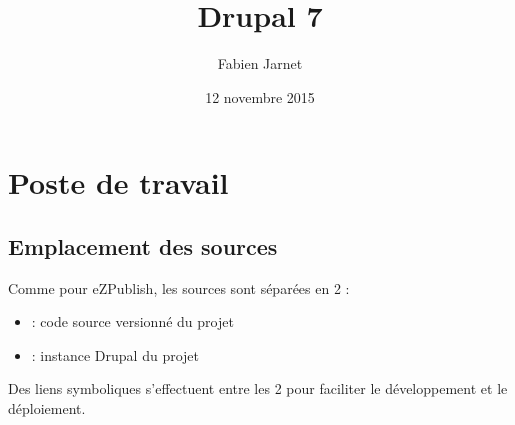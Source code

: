 \documentclass[a4paper,11pt,french]{rtdsphinxmanual}
\title{Drupal 7}
\date{12 novembre 2015}
\author{Fabien Jarnet}
\begin{document}
\maketitle
\tableofcontents
{}\label{index::doc}



\chapter{Poste de travail}
\label{poste_travail:drupal-7}\label{poste_travail::doc}\label{poste_travail:poste-de-travail}

\section{Emplacement des sources}
\label{poste_travail:emplacement-des-sources}
Comme pour eZPublish, les sources sont séparées en 2 :
\begin{itemize}
\item {} 
 : code source versionné du projet

\item {} 
 : instance Drupal du projet

\end{itemize}

Des liens symboliques s'effectuent entre les 2 pour faciliter le développement et le déploiement.

{\hfill{}\hfill}
\end{document}
